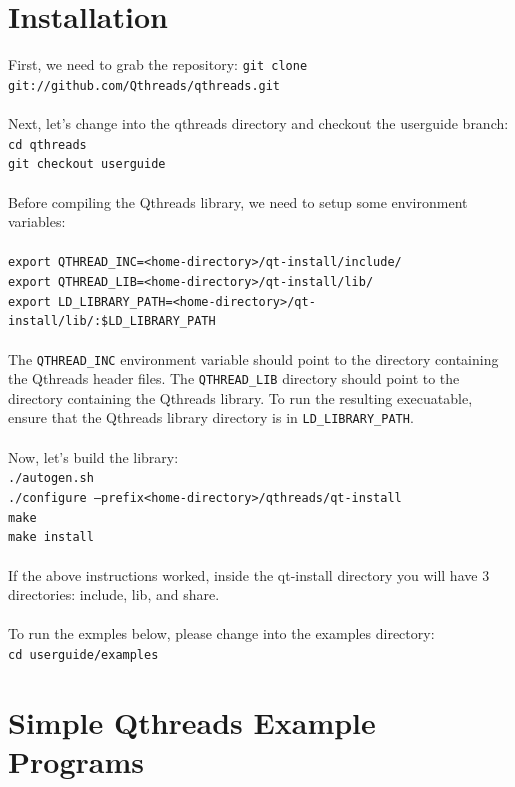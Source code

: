 \documentclass[12pt,fullpage]{article}
\begin{document}
\section{Installation}
First, we need to grab the repository:
{\footnotesize{\tt git clone git://github.com/Qthreads/qthreads.git}}
\\ \\
Next, let's change into the qthreads directory and checkout the userguide branch:
\\
{\footnotesize{\tt cd qthreads}}
\\
{\footnotesize{\tt git checkout userguide}}
\\ \\
Before compiling the Qthreads library, we need to setup some environment variables:
\\ \\
{\footnotesize{\tt export QTHREAD\_INC=<home-directory>/qt-install/include/}}
\\
{\footnotesize{\tt export QTHREAD\_LIB=<home-directory>/qt-install/lib/}}
\\
{\footnotesize{\tt export LD\_LIBRARY\_PATH=<home-directory>/qt-install/lib/:\$LD\_LIBRARY\_PATH}}
\\ \\
The {\tt QTHREAD\_INC} environment variable should point to the directory containing the Qthreads header files.  The {\tt QTHREAD\_LIB} directory should point to the directory containing the Qthreads library.  To run the resulting execuatable, ensure that the Qthreads library directory is in {\tt LD\_LIBRARY\_PATH}.
\\ \\
Now, let's build the library: 
\\
{\footnotesize{\tt ./autogen.sh}}
\\
{\footnotesize{\tt ./configure --prefix<home-directory>/qthreads/qt-install}}
\\
{\footnotesize{\tt make}}
\\
{\footnotesize{\tt make install}}
\\ \\
If the above instructions worked, inside the qt-install directory you will have 3 directories: include, lib, and share.
\\ \\ 
To run the exmples below, please change into the examples directory:
\\
{\footnotesize{\tt cd userguide/examples}}

\newpage
\section{Simple Qthreads Example Programs}
\end{document}
